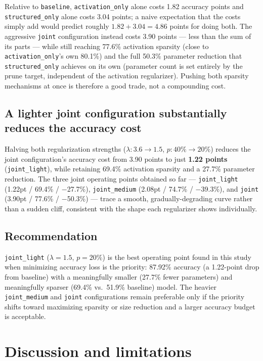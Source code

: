 \documentclass[11pt]{article}
\newcommand{\code}[1]{\texttt{#1}}
\begin{document}
Relative to \code{baseline}, \code{activation\_only} alone costs 1.82 accuracy points and \code{structured\_only} alone costs 3.04 points; a naive expectation that the costs simply add would predict roughly $1.82+3.04=4.86$ points for doing both. The aggressive \code{joint} configuration instead costs 3.90 points --- less than the sum of its parts --- while still reaching 77.6\% activation sparsity (close to \code{activation\_only}'s own 80.1\%) and the full 50.3\% parameter reduction that \code{structured\_only} achieves on its own (parameter count is set entirely by the prune target, independent of the activation regularizer). Pushing both sparsity mechanisms at once is therefore a good trade, not a compounding cost.

\subsection{A lighter joint configuration substantially reduces the accuracy cost}

Halving both regularization strengths ($\lambda:3.6\rightarrow1.5$, $p:40\%\rightarrow20\%$) reduces the joint configuration's accuracy cost from 3.90 points to just \textbf{1.22 points} (\code{joint\_light}), while retaining 69.4\% activation sparsity and a 27.7\% parameter reduction. The three joint operating points obtained so far --- \code{joint\_light} (1.22pt / 69.4\% / $-$27.7\%), \code{joint\_medium} (2.08pt / 74.7\% / $-$39.3\%), and \code{joint} (3.90pt / 77.6\% / $-$50.3\%) --- trace a smooth, gradually-degrading curve rather than a sudden cliff, consistent with the shape each regularizer shows individually.

\subsection{Recommendation}

\code{joint\_light} ($\lambda=1.5$, $p=20\%$) is the best operating point found in this study when minimizing accuracy loss is the priority: 87.92\% accuracy (a 1.22-point drop from baseline) with a meaningfully smaller (27.7\% fewer parameters) and meaningfully sparser (69.4\% vs.\ 51.9\% baseline) model. The heavier \code{joint\_medium} and \code{joint} configurations remain preferable only if the priority shifts toward maximizing sparsity or size reduction and a larger accuracy budget is acceptable.

\section{Discussion and limitations}
\end{document}
